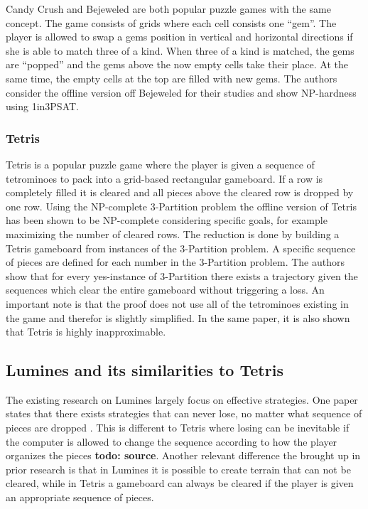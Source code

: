 Candy Crush and Bejeweled are both popular puzzle games with the same concept. The game consists of grids where each cell consists one ``gem''. The player is allowed to swap a gems position in vertical and horizontal directions if she is able to match three of a kind. When three of a kind is matched, the gems are ``popped'' and the gems above the now empty cells take their place. At the same time, the empty cells at the top are filled with new gems. The authors consider the offline version off Bejeweled for their studies and show NP-hardness using 1in3PSAT. \cite{candy}

\subsubsection{Tetris}

Tetris is a popular puzzle game where the player is given a sequence of tetrominoes to pack into a grid-based rectangular gameboard. If a row is completely filled it is cleared and all pieces above the cleared row is dropped by one row. Using the NP-complete 3-Partition problem the offline version of Tetris has been shown to be NP-complete considering specific goals, for example maximizing the number of cleared rows. The reduction is done by building a Tetris gameboard from instances of the 3-Partition problem. A specific sequence of pieces are defined for each number in the 3-Partition problem. The authors show that for every yes-instance of 3-Partition there exists a trajectory given the sequences which clear the entire gameboard without triggering a loss. An important note is that the proof does not use all of the tetrominoes existing in the game and therefor is slightly simplified. In the same paper, it is also shown that Tetris is highly inapproximable. 

\subsection{Lumines and its similarities to Tetris}
\label{subsub:sim}

The existing research on Lumines largely focus on effective strategies. One paper states that there exists strategies that can never lose, no matter what sequence of pieces are dropped \cite{lumines}. This is different to Tetris where losing can be inevitable if the computer is allowed to change the sequence according to how the player organizes the pieces \textbf{todo: source}. Another relevant difference the brought up in prior research is that in Lumines it is possible to create terrain that can not be cleared, while in Tetris a gameboard can always be cleared if the player is given an appropriate sequence of pieces.

